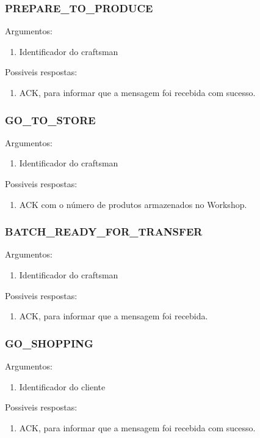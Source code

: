 \documentclass[11pt,a4paper]{report}
\begin{document}
\subsubsection{PREPARE\_TO\_PRODUCE}
Argumentos:
\begin{enumerate}
\itemsep-0.4em 
\item Identificador do craftsman
\end{enumerate}
Possiveis respostas: 
\begin{enumerate}
\itemsep-0.4em 
\item ACK, para informar que a mensagem foi recebida com sucesso.
\end{enumerate}

\subsubsection{GO\_TO\_STORE}
Argumentos:
\begin{enumerate}
\itemsep-0.4em 
\item Identificador do craftsman
\end{enumerate}
Possiveis respostas: 
\begin{enumerate}
\itemsep-0.4em 
\item ACK com o número de produtos armazenados no Workshop.
\end{enumerate}

\subsubsection{BATCH\_READY\_FOR\_TRANSFER}
Argumentos:
\begin{enumerate}
\itemsep-0.4em 
\item Identificador do craftsman
\end{enumerate}
Possiveis respostas: 
\begin{enumerate}
\itemsep-0.4em 
\item ACK, para informar que a mensagem foi recebida.
\end{enumerate}

\subsubsection{GO\_SHOPPING}
Argumentos:
\begin{enumerate}
    \itemsep-0.4em
    \item Identificador do cliente
\end{enumerate}
Possiveis respostas:
\begin{enumerate}
    \itemsep-0.4em
    \item ACK, para informar que a mensagem foi recebida com sucesso.
\end{enumerate}
\end{document}
